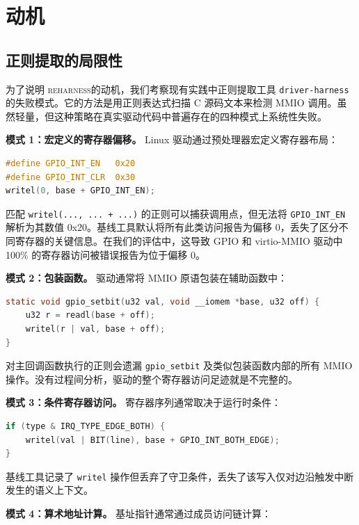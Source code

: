 \documentclass[sigplan, screen, review, anonymous]{acmart}
\newcommand{\reharness}{\textsc{reharness}}
\begin{document}
\section{动机}
\label{sec:motivation}

\subsection{正则提取的局限性}

为了说明 \reharness 的动机，我们考察现有实践中正则提取工具 \texttt{driver-harness}~\cite{driverharness} 的失败模式。它的方法是用正则表达式扫描 C 源码文本来检测 MMIO 调用。虽然轻量，但这种策略在真实驱动代码中普遍存在的四种模式上系统性失败。

\textbf{模式 1：宏定义的寄存器偏移。} Linux 驱动通过预处理器宏定义寄存器布局：

\begin{lstlisting}[language=C]
#define GPIO_INT_EN   0x20
#define GPIO_INT_CLR  0x30
writel(0, base + GPIO_INT_EN);
\end{lstlisting}

匹配 \texttt{writel(..., ... + ...)} 的正则可以捕获调用点，但无法将 \texttt{GPIO\_INT\_EN} 解析为其数值 0x20。基线工具默认将所有此类访问报告为偏移 0，丢失了区分不同寄存器的关键信息。在我们的评估中，这导致 GPIO 和 virtio-MMIO 驱动中 100\% 的寄存器访问被错误报告为位于偏移 0。

\textbf{模式 2：包装函数。} 驱动通常将 MMIO 原语包装在辅助函数中：

\begin{lstlisting}[language=C]
static void gpio_setbit(u32 val, void __iomem *base, u32 off) {
    u32 r = readl(base + off);
    writel(r | val, base + off);
}
\end{lstlisting}

对主回调函数执行的正则会遗漏 \texttt{gpio\_setbit} 及类似包装函数内部的所有 MMIO 操作。没有过程间分析，驱动的整个寄存器访问足迹就是不完整的。

\textbf{模式 3：条件寄存器访问。} 寄存器序列通常取决于运行时条件：

\begin{lstlisting}[language=C]
if (type & IRQ_TYPE_EDGE_BOTH) {
    writel(val | BIT(line), base + GPIO_INT_BOTH_EDGE);
}
\end{lstlisting}

基线工具记录了 \texttt{writel} 操作但丢弃了守卫条件，丢失了该写入仅对边沿触发中断发生的语义上下文。

\textbf{模式 4：算术地址计算。} 基址指针通常通过成员访问链计算：
\end{document}

